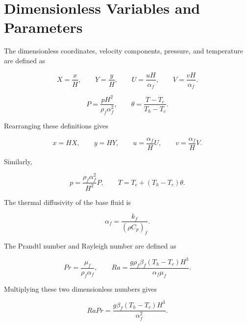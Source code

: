 \documentclass[preprint,3p,number]{elsarticle}
\begin{document}
\section{Dimensionless Variables and Parameters}

The dimensionless coordinates, velocity components, pressure,
and temperature are defined as

\begin{equation}
X=\frac{x}{H},
\qquad
Y=\frac{y}{H},
\qquad
U=\frac{uH}{\alpha_f},
\qquad
V=\frac{vH}{\alpha_f}.
\label{eq:dimensionless_coordinates}
\end{equation}

\begin{equation}
P=\frac{pH^2}{\rho_f\alpha_f^2},
\qquad
\theta=\frac{T-T_c}{T_h-T_c}.
\label{eq:dimensionless_pressure_temperature}
\end{equation}

Rearranging these definitions gives

\begin{equation}
x=HX,
\qquad
y=HY,
\qquad
u=\frac{\alpha_f}{H}U,
\qquad
v=\frac{\alpha_f}{H}V.
\label{eq:inverse_coordinates_velocity}
\end{equation}

Similarly,

\begin{equation}
p=\frac{\rho_f\alpha_f^2}{H^2}P,
\qquad
T=T_c+(T_h-T_c)\theta.
\label{eq:inverse_pressure_temperature}
\end{equation}

The thermal diffusivity of the base fluid is

\begin{equation}
\alpha_f=\frac{k_f}{(\rho C_p)_f}.
\label{eq:thermal_diffusivity}
\end{equation}

The Prandtl number and Rayleigh number are defined as

\begin{equation}
Pr=\frac{\mu_f}{\rho_f\alpha_f},
\qquad
Ra=\frac{g\rho_f\beta_f(T_h-T_c)H^3}
{\alpha_f\mu_f}.
\label{eq:dimensionless_numbers}
\end{equation}

Multiplying these two dimensionless numbers gives

\begin{equation}
RaPr
=
\frac{g\beta_f(T_h-T_c)H^3}{\alpha_f^2}.
\label{eq:RaPr}
\end{equation}
\end{document}
